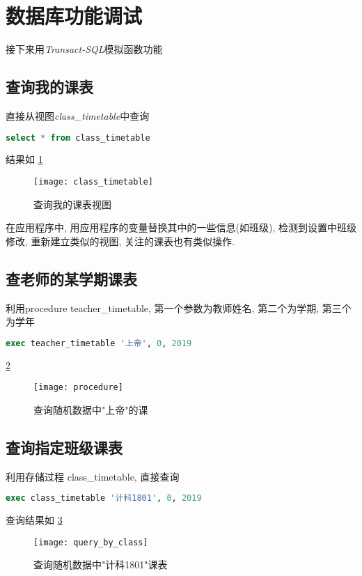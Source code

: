 \documentclass{myreport}
\begin{document}
\section{数据库功能调试}
    接下来用\emph{Transact-SQL}模拟函数功能
  \subsection{查询我的课表}
    直接从视图\emph{class\_timetable}中查询
    \begin{lstlisting}[language=sql]
        select * from class_timetable
    \end{lstlisting}

      结果如
      \cref{fig:class_timetable}
      \begin{figure}[H]
        \centering
        \texttt{[image: class\_timetable]}
        \caption{查询我的课表视图}
        \label{fig:class_timetable}
      \end{figure}

    在应用程序中, 用应用程序的变量替换其中的一些信息(如班级),
    检测到设置中班级修改, 重新建立类似的视图, 关注的课表也有类似操作.
  \subsection{查老师的某学期课表}
    利用procedure teacher\_timetable, 第一个参数为教师姓名, 第二个为学期, 第三个为学年
    \begin{lstlisting}[language=sql]
      exec teacher_timetable '上帝', 0, 2019
    \end{lstlisting}
    \cref{fig:procedure}
    \begin{figure}[H]
      \centering
      \texttt{[image: procedure]}
      \caption{查询随机数据中"上帝"的课}
      \label{fig:procedure}
    \end{figure}

  \subsection{查询指定班级课表}
    利用存储过程 class\_timetable, 直接查询
    \begin{lstlisting}[language=sql]
      exec class_timetable '计科1801', 0, 2019
    \end{lstlisting}

    查询结果如
    \cref{fig:query_by_class}
    \begin{figure}[H]
      \centering
      \texttt{[image: query\_by\_class]}
      \caption{查询随机数据中"计科1801"课表}
      \label{fig:query_by_class}
    \end{figure}
\end{document}
